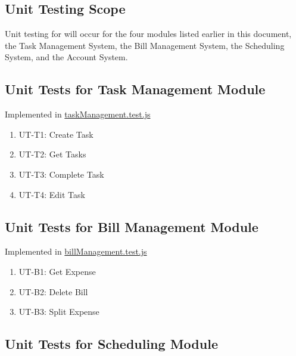 \documentclass[12pt, titlepage]{article}
\begin{document}
\subsection{Unit Testing Scope}

Unit testing for \progname{} will occur  for the four modules listed earlier in this document, the Task Management System, the Bill Management System, the Scheduling System, and the Account System.


\subsection{Unit Tests for Task Management Module}

Implemented in \href{https://github.com/DangJustin/CapstoneProject/blob/main/src/rev0_demo/server/tests/taskManagement.test.js}{taskManagement.test.js}

\begin{enumerate}
    \item UT-T1: Create Task
    \item UT-T2: Get Tasks
    \item UT-T3: Complete Task
    \item UT-T4: Edit Task
\end{enumerate}

\subsection{Unit Tests for Bill Management Module}

Implemented in \href{https://github.com/DangJustin/CapstoneProject/blob/main/src/rev0_demo/server/tests/billManagement.test.js}{billManagement.test.js}

\begin{enumerate}
    \item UT-B1: Get Expense
    \item UT-B2: Delete Bill
    \item UT-B3: Split Expense
\end{enumerate}


\subsection{Unit Tests for Scheduling Module}
\end{document}
